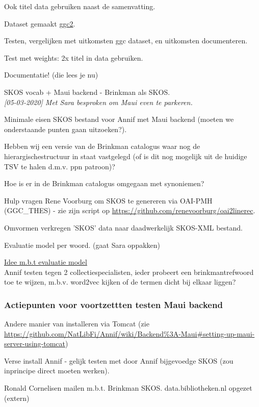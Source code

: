 \documentclass{article}
\newcommand{\cmark}{\ding{51}}%
\newcommand{\xmark}{\ding{55}}%
\newcommand{\done}{\rlap{$\square$}{\raisebox{2pt}{\large\hspace{1pt}\cmark}}%
\hspace{-2.5pt}}
\newcommand{\wontfix}{\rlap{$\square$}{\large\hspace{1pt}\xmark}}
\begin{document}
\begin{todolist}
    \item Ook titel data gebruiken naast de samenvatting.
    \begin{todolist}
        \item[\done] Dataset gemaakt \href{https://github.com/KBNLresearch/Annif_data_exp/blob/master/vocab2.zip}{ggc2}.
        \item Testen, vergelijken met uitkomsten ggc dataset, en uitkomsten documenteren.
        \item Test met weights: 2x titel in data gebruiken.
    \end{todolist}
    \item Documentatie! (die lees je nu)
    \item SKOS vocab + Maui backend - Brinkman als SKOS. \\ 
    \textit{[05-03-2020] Met Sara besproken om Maui even te parkeren.}
    \begin{todolist}
      \item Minimale eisen SKOS bestand voor Annif met Maui backend (moeten we onderstaande punten gaan uitzoeken?).
      \item Hebben wij een versie van de Brinkman catalogus waar nog de hierargischestructuur in staat vastgelegd (of is dit nog mogelijk uit de huidige TSV te halen d.m.v. ppn patroon)?
      \item Hoe is er in de Brinkman catalogus omgegaan met synoniemen?
      \item[\done] Hulp vragen Rene Voorburg om SKOS te genereren via OAI-PMH (GGC\_THES) - zie zijn script op \url{https://github.com/renevoorburg/oai2linerec}.
      \item Omvormen verkregen 'SKOS' data naar daadwerkelijk SKOS-XML bestand. 
      \item[\wontfix] Evaluatie model per woord. (gaat Sara oppakken)
    \end{todolist}
    \item \href{https://github.com/NatLibFi/Annif/wiki/Achieving-good-results}{Idee m.b.t evaluatie model} \\
    Annif testen tegen 2 collectiespecialisten, ieder probeert een brinkmantrefwoord toe te wijzen, m.b.v. word2vec kijken of de termen dicht bij elkaar liggen?
  \end{todolist}

  
\subsubsection{Actiepunten voor voortzettten testen Maui backend}
\begin{todolist}
  \item Andere manier van installeren via Tomcat (zie \url{https://github.com/NatLibFi/Annif/wiki/Backend\%3A-Maui#setting-up-maui-server-using-tomcat})
  \item Verse install Annif - gelijk testen met door Annif bijgevoedge SKOS (zou inprincipe direct moeten werken).
  \item Ronald Cornelisen mailen m.b.t. Brinkman SKOS. data.bibliotheken.nl opgezet (extern)
\end{todolist}
\end{document}
